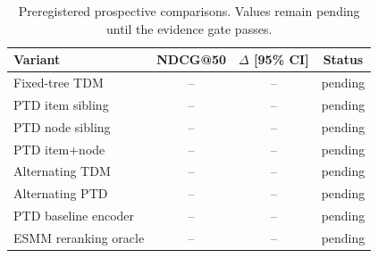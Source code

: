 \begin{table}[!t]
\caption{Preregistered prospective comparisons. Values remain pending until the evidence gate passes.}
\label{tab:ptd-results}
\centering
\scriptsize
\begin{tabular}{lccc}
\toprule Variant & NDCG@50 & $\Delta$ [95\% CI] & Status \\ \midrule
Fixed-tree TDM & -- & -- & pending \\
PTD item sibling & -- & -- & pending \\
PTD node sibling & -- & -- & pending \\
PTD item+node & -- & -- & pending \\
Alternating TDM & -- & -- & pending \\
Alternating PTD & -- & -- & pending \\
PTD baseline encoder & -- & -- & pending \\
ESMM reranking oracle & -- & -- & pending \\
\bottomrule\end{tabular}
\end{table}

